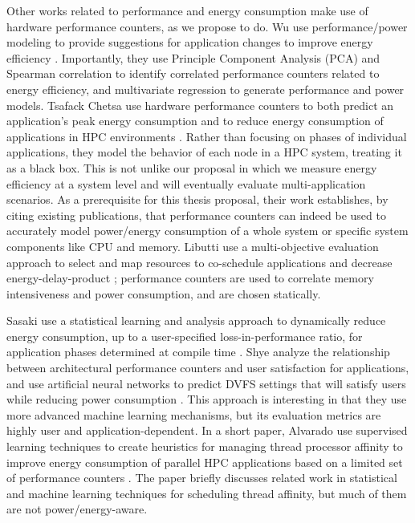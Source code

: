 Other works related to performance and energy consumption make use of hardware performance counters, as we propose to do.
Wu \etal use performance/power modeling to provide suggestions for application changes to improve energy efficiency \cite{WuHPCComputer}.
Importantly, they use Principle Component Analysis (PCA) and Spearman correlation to identify correlated performance counters related to energy efficiency, and multivariate regression to generate performance and power models.
Tsafack Chetsa \etal use hardware performance counters to both predict an application's peak energy consumption and to reduce energy consumption of applications in HPC environments \cite{Chetsa}.
Rather than focusing on phases of individual applications, they model the behavior of each node in a HPC system, treating it as a black box.
This is not unlike our proposal in which we measure energy efficiency at a system level and will eventually evaluate multi-application scenarios.
As a prerequisite for this thesis proposal, their work establishes, by citing existing publications, that performance counters can indeed be used to accurately model power/energy consumption of a whole system or specific system components like CPU and memory.
Libutti \etal use a multi-objective evaluation approach to select and map resources to co-schedule applications and decrease energy-delay-product \cite{Libutti2014}; performance counters are used to correlate memory intensiveness and power consumption, and are chosen statically.

Sasaki \etal use a statistical learning and analysis approach to dynamically reduce energy consumption, up to a user-specified loss-in-performance ratio, for application phases determined at compile time \cite{Sasaki}.
Shye \etal analyze the relationship between architectural performance counters and user satisfaction for applications, and use artificial neural networks to predict DVFS settings that will satisfy users while reducing power consumption \cite{ShyeIDVFS}.
This approach is interesting in that they use more advanced machine learning mechanisms, but its evaluation metrics are highly user and application-dependent.
In a short paper, Alvarado \etal use supervised learning techniques to create heuristics for managing thread processor affinity to improve energy consumption of parallel HPC applications based on a limited set of performance counters \cite{Alvarado}.
The paper briefly discusses related work in statistical and machine learning techniques for scheduling thread affinity, but much of them are not power/energy-aware.

